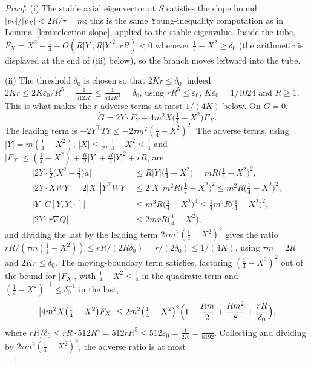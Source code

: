 \begin{proof}
(i) The stable axial eigenvector at $S$ satisfies the slope bound $|v_Y|/|v_X|<2R/\tau=m$; this is the same Young-inequality computation as in Lemma~\ref{lem:selection-slope}, applied to the stable eigenvalue. Inside the tube, $F_X=X^2-\frac14+O(R|Y|,R|Y|^2,rR)<0$ whenever $\frac14-X^2\ge\delta_0$ (the arithmetic is displayed at the end of (iii) below), so the branch moves leftward into the tube.

(ii) The threshold $\delta_0$ is chosen so that $2Kr\le\delta_0$: indeed $2Kr\le2K\varepsilon_0/R^5=\frac1{512R^5}\le\frac1{512R^4}=\delta_0$, using $rR^5\le\varepsilon_0$, $K\varepsilon_0=1/1024$ and $R\ge1$. This is what makes the $r$-adverse terms at most $1/(4K)$ below. On $G=0$,
\[
\dot G=2Y\cdot F_Y+4m^2X\bigl(\tfrac14-X^2\bigr)F_X .
\]
The leading term is $-2Y^{\top}TY\le-2\tau m^2(\frac14-X^2)^2$. The adverse terms, using $|Y|=m(\frac14-X^2)$, $|X|\le\frac12$, $\frac14-X^2\le\frac14$ and $|F_X|\le(\frac14-X^2)+\frac R2|Y|+\frac R2|Y|^2+rR$, are
\begin{equation}\label{eq:selection-tubeterms}
\begin{aligned}
\bigl|2Y\cdot\tfrac12\bigl(X^2-\tfrac14\bigr)a\bigr|&\le R|Y|\bigl(\tfrac14-X^2\bigr)=mR\bigl(\tfrac14-X^2\bigr)^2,\\
|2Y\cdot XWY|=2|X|\,|Y^{\top}WY|&\le2|X|\,m^2R\bigl(\tfrac14-X^2\bigr)^2\le m^2R\bigl(\tfrac14-X^2\bigr)^2,\\
\bigl|Y\cdot C[Y,Y,\cdot\,]\bigr|&\le m^3R\bigl(\tfrac14-X^2\bigr)^3\le\tfrac14m^3R\bigl(\tfrac14-X^2\bigr)^2,\\
|2Y\cdot r\nabla Q|&\le2mrR\bigl(\tfrac14-X^2\bigr),
\end{aligned}
\end{equation}
and dividing the last by the leading term $2\tau m^2(\frac14-X^2)^2$ gives the ratio $rR/(\tau m(\frac14-X^2))\le rR/(2R\delta_0)=r/(2\delta_0)\le1/(4K)$, using $\tau m=2R$ and $2Kr\le\delta_0$. The moving-boundary term satisfies, factoring $(\frac14-X^2)^2$ out of the bound for $|F_X|$, with $\frac14-X^2\le\frac14$ in the quadratic term and $(\frac14-X^2)^{-1}\le\delta_0^{-1}$ in the last,
\[
\bigl|4m^2X\bigl(\tfrac14-X^2\bigr)F_X\bigr|\le2m^2\bigl(\tfrac14-X^2\bigr)^2\Bigl(1+\frac{Rm}2+\frac{Rm^2}8+\frac{rR}{\delta_0}\Bigr),
\]
where $rR/\delta_0\le rR\cdot512R^4=512rR^5\le512\varepsilon_0=\frac1{2K}=\frac1{8192}$. Collecting and dividing by $2\tau m^2(\frac14-X^2)^2$, the adverse ratio is at most
\begin{equation}\label{eq:selection-tubeledger}

\end{equation}
\end{proof}
